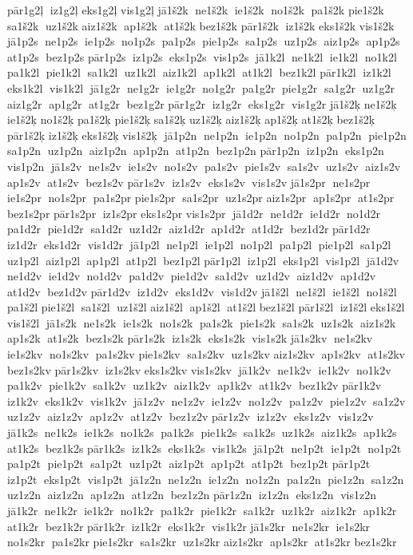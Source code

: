  pār1g2ļ  iz1g2ļ 	 eks1g2ļ 	 vis1g2ļ 	 jā1š2k  ne1š2k  ie1š2k  no1š2k  pa1š2k 	 pie1š2k  sa1š2k  uz1š2k 	 aiz1š2k  ap1š2k  at1š2k 	 bez1š2k 
 pār1š2k  iz1š2k 	 eks1š2k 	 vis1š2k  jā1p2s  ne1p2s  ie1p2s  no1p2s  pa1p2s  pie1p2s  sa1p2s  uz1p2s  aiz1p2s  ap1p2s  at1p2s  bez1p2s 	 pār1p2s  iz1p2s  eks1p2s  vis1p2s  jā1k2l  ne1k2l  ie1k2l  no1k2l  pa1k2l  pie1k2l  sa1k2l  uz1k2l  aiz1k2l  ap1k2l  at1k2l  bez1k2l 	 pār1k2l  iz1k2l  eks1k2l  vis1k2l  jā1g2r  ne1g2r  ie1g2r  no1g2r  pa1g2r  pie1g2r  sa1g2r  uz1g2r  aiz1g2r  ap1g2r  at1g2r  bez1g2r 	 pār1g2r  iz1g2r  eks1g2r  vis1g2r 
 jā1š2ķ 	 ne1š2ķ 	 ie1š2ķ 	 no1š2ķ 	 pa1š2ķ 
 pie1š2ķ 	 sa1š2ķ 	 uz1š2ķ 
 aiz1š2ķ 	 ap1š2ķ 	 at1š2ķ 
 bez1š2ķ  pār1š2ķ 	 iz1š2ķ 
 eks1š2ķ 
 vis1š2ķ  jā1p2n  ne1p2n  ie1p2n  no1p2n  pa1p2n  pie1p2n  sa1p2n  uz1p2n  aiz1p2n  ap1p2n  at1p2n  bez1p2n 	 pār1p2n  iz1p2n  eks1p2n  vis1p2n  jā1s2v  ne1s2v  ie1s2v  no1s2v  pa1s2v  pie1s2v  sa1s2v  uz1s2v  aiz1s2v  ap1s2v  at1s2v  bez1s2v 	 pār1s2v  iz1s2v  eks1s2v  vis1s2v 	 jā1s2pr  ne1s2pr  ie1s2pr  no1s2pr  pa1s2pr 	 pie1s2pr  sa1s2pr  uz1s2pr 	 aiz1s2pr  ap1s2pr  at1s2pr 	 bez1s2pr 
 pār1s2pr  iz1s2pr 	 eks1s2pr 	 vis1s2pr  jā1d2r  ne1d2r  ie1d2r  no1d2r  pa1d2r  pie1d2r  sa1d2r  uz1d2r  aiz1d2r  ap1d2r  at1d2r  bez1d2r 	 pār1d2r  iz1d2r  eks1d2r  vis1d2r  jā1p2l  ne1p2l  ie1p2l  no1p2l  pa1p2l  pie1p2l  sa1p2l  uz1p2l  aiz1p2l  ap1p2l  at1p2l  bez1p2l 	 pār1p2l  iz1p2l  eks1p2l  vis1p2l  jā1d2v  ne1d2v  ie1d2v  no1d2v  pa1d2v  pie1d2v  sa1d2v  uz1d2v  aiz1d2v  ap1d2v  at1d2v  bez1d2v 	 pār1d2v  iz1d2v  eks1d2v  vis1d2v 	 jā1š2l  ne1š2l  ie1š2l  no1š2l  pa1š2l 	 pie1š2l  sa1š2l  uz1š2l 	 aiz1š2l  ap1š2l  at1š2l 	 bez1š2l 
 pār1š2l  iz1š2l 	 eks1š2l 	 vis1š2l  jā1s2k  ne1s2k  ie1s2k  no1s2k  pa1s2k  pie1s2k  sa1s2k  uz1s2k  aiz1s2k  ap1s2k  at1s2k  bez1s2k 	 pār1s2k  iz1s2k  eks1s2k  vis1s2k 	 jā1s2kv  ne1s2kv  ie1s2kv  no1s2kv  pa1s2kv 	 pie1s2kv  sa1s2kv  uz1s2kv 	 aiz1s2kv  ap1s2kv  at1s2kv 	 bez1s2kv 
 pār1s2kv  iz1s2kv 	 eks1s2kv 	 vis1s2kv  jā1k2v  ne1k2v  ie1k2v  no1k2v  pa1k2v  pie1k2v  sa1k2v  uz1k2v  aiz1k2v  ap1k2v  at1k2v  bez1k2v 	 pār1k2v  iz1k2v  eks1k2v  vis1k2v  jā1z2v  ne1z2v  ie1z2v  no1z2v  pa1z2v  pie1z2v  sa1z2v  uz1z2v  aiz1z2v  ap1z2v  at1z2v  bez1z2v 	 pār1z2v  iz1z2v  eks1z2v  vis1z2v  jā1k2s  ne1k2s  ie1k2s  no1k2s  pa1k2s  pie1k2s  sa1k2s  uz1k2s  aiz1k2s  ap1k2s  at1k2s  bez1k2s 	 pār1k2s  iz1k2s  eks1k2s  vis1k2s  jā1p2t  ne1p2t  ie1p2t  no1p2t  pa1p2t  pie1p2t  sa1p2t  uz1p2t  aiz1p2t  ap1p2t  at1p2t  bez1p2t 	 pār1p2t  iz1p2t  eks1p2t  vis1p2t  jā1z2n  ne1z2n  ie1z2n  no1z2n  pa1z2n  pie1z2n  sa1z2n  uz1z2n  aiz1z2n  ap1z2n  at1z2n  bez1z2n 	 pār1z2n  iz1z2n  eks1z2n  vis1z2n  jā1k2r  ne1k2r  ie1k2r  no1k2r  pa1k2r  pie1k2r  sa1k2r  uz1k2r  aiz1k2r  ap1k2r  at1k2r  bez1k2r 	 pār1k2r  iz1k2r  eks1k2r  vis1k2r 	 jā1s2kr  ne1s2kr  ie1s2kr  no1s2kr  pa1s2kr 	 pie1s2kr  sa1s2kr  uz1s2kr 	 aiz1s2kr  ap1s2kr  at1s2kr 	 bez1s2kr 
